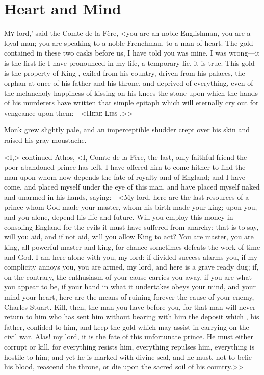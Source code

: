 \chapter{Heart and Mind}

\lettrine[ante=`]{M}{y} lord,' said the Comte de la Fère, <you are an noble Englishman, you are a loyal man; you are speaking to a noble Frenchman, to a man of heart. The gold contained in these two casks before us, I have told you was mine. I was wrong—it is the first lie I have pronounced in my life, a temporary lie, it is true. This gold is the property of King , exiled from his country, driven from his palaces, the orphan at once of his father and his throne, and deprived of everything, even of the melancholy happiness of kissing on his knees the stone upon which the hands of his murderers have written that simple epitaph which will eternally cry out for vengeance upon them:—<\textsc{Here Lies \@.}>>

Monk grew slightly pale, and an imperceptible shudder crept over his skin and raised his gray moustache.

<I,> continued Athos, <I, Comte de la Fère, the last, only faithful friend the poor abandoned prince has left, I have offered him to come hither to find the man upon whom now depends the fate of royalty and of England; and I have come, and placed myself under the eye of this man, and have placed myself naked and unarmed in his hands, saying:—<My lord, here are the last resources of a prince whom God made your master, whom his birth made your king; upon you, and you alone, depend his life and future. Will you employ this money in consoling England for the evils it must have suffered from anarchy; that is to say, will you aid, and if not aid, will you allow King  to act? You are master, you are king, all-powerful master and king, for chance sometimes defeats the work of time and God. I am here alone with you, my lord: if divided success alarms you, if my complicity annoys you, you are armed, my lord, and here is a grave ready dug; if, on the contrary, the enthusiasm of your cause carries you away, if you are what you appear to be, if your hand in what it undertakes obeys your mind, and your mind your heart, here are the means of ruining forever the cause of your enemy, Charles Stuart. Kill, then, the man you have before you, for that man will never return to him who has sent him without bearing with him the deposit which , his father, confided to him, and keep the gold which may assist in carrying on the civil war. Alas! my lord, it is the fate of this unfortunate prince. He must either corrupt or kill, for everything resists him, everything repulses him, everything is hostile to him; and yet he is marked with divine seal, and he must, not to belie his blood, reascend the throne, or die upon the sacred soil of his country.>>

